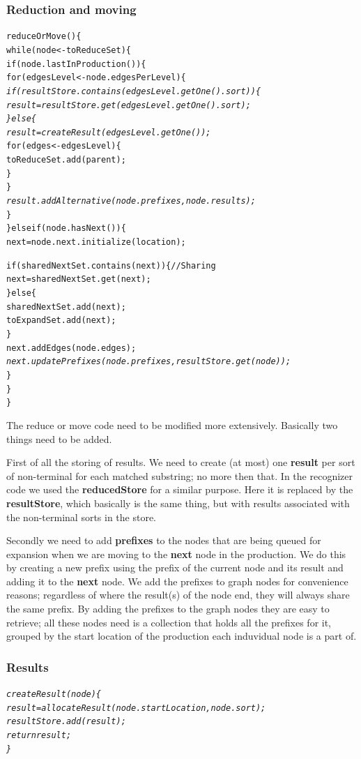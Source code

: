 \documentclass[a4paper,10pt]{article}
\begin{document}
\subsubsection{Reduction and moving}
{\small
\begin{alltt}
reduceOrMove()\{
  while(node <- toReduceSet)\{
    if(node.lastInProduction())\{
      for(edgesLevel <- node.edgesPerLevel)\{\textit{
        if(resultStore.contains(edgesLevel.getOne().sort))\{
          result = resultStore.get(edgesLevel.getOne().sort);
        \}else\{
          result = createResult(edgesLevel.getOne());}
          for(edges <- edgesLevel)\{
            toReduceSet.add(parent);
          \}
        \}\textit{
        result.addAlternative(node.prefixes, node.results);}
      \}
    \}else if(node.hasNext())\{
      next = node.next.initialize(location);
      
      if(sharedNextSet.contains(next))\{ // Sharing
        next = sharedNextSet.get(next);
      \}else\{
        sharedNextSet.add(next);
        toExpandSet.add(next);
      \}
      next.addEdges(node.edges);\textit{
      next.updatePrefixes(node.prefixes, resultStore.get(node));}
    \}
  \}
\}
\end{alltt}
}

The reduce or move code need to be modified more extensively. Basically two things need to be added.

First of all the storing of results. We need to create (at most) one {\bf result} per sort of non-terminal for each matched substring; no more then that. In the recognizer code we used the {\bf reducedStore} for a similar purpose. Here it is replaced by the {\bf resultStore}, which basically is the same thing, but with results associated with the non-terminal sorts in the store.

Secondly we need to add {\bf prefixes} to the nodes that are being queued for expansion when we are moving to the {\bf next} node in the production. We do this by creating a new prefix using the prefix of the current node and its result and adding it to the {\bf next} node. We add the prefixes to graph nodes for convenience reasons; regardless of where the result(s) of the node end, they will always share the same prefix. By adding the prefixes to the graph nodes they are easy to retrieve; all these nodes need is a collection that holds all the prefixes for it, grouped by the start location of the production each induvidual node is a part of.

\pagebreak
\subsubsection{Results}
{\small
\begin{alltt}
\textit{createResult(node)\{
  result = allocateResult(node.startLocation, node.sort);
  resultStore.add(result);
  return result;
\}}
\end{alltt}
}
\end{document}

